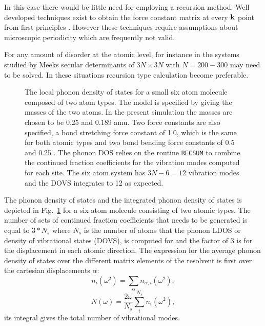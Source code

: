 In this case there would be little need for employing a recursion method.
Well developed techniques exist to obtain the force constant 
matrix at every ${\bf k}$ point from first principles \cite{baroni01}.
However these techniques require assumptions about
microscopic periodicity which are frequently  
not valid. 

For any amount of disorder at the atomic level, for instance in the systems 
studied by Meeks secular determinants of $3N\times3N$ with
$N=200-300$ may need to be solved. In these situations recursion 
type calculation become preferable. \cite{dean92}
%
\begin{figure}
\begin{center}
{\graphicspath{{./invariance/rec_examples/phonon/}}}
\caption{The local phonon density of states for a small six atom molecule 
composed of two atom types. The model is specified by giving the 
masses of the two atoms. In the present simulation 
the masses are chosen to be 0.25 and $0.189$ amu. Two force constants are also
specified, a bond stretching force constant of 1.0, 
which is the same for both atomic types
and two bond bending force constants of 0.5 and 0.25 \label{fig:phonondos}. 
The phonon DOS relies on the routine
\texttt{RECSUM} to combine the continued fraction coefficients 
for the vibration modes computed for each site. 
The six atom system has $3N-6=12$ vibration modes and the 
DOVS integrates to 12 as expected.}
\end{center}
\end{figure}
%
The phonon density of states and the integrated phonon density of 
states is depicted in Fig.~\ref{fig:phonondos} 
for a six atom molecule consisting of two atomic types. The number of 
sets of continued fraction coefficients
that needs to be generated is equal to $3*N_{s}$ where $N_{s}$ 
is the number of atoms that the phonon LDOS
or density of vibrational states (DOVS), is computed 
for and the factor of 3 is for the displacement in each 
atomic direction. The expression for the average phonon density of states
over the different matrix elements of the resolvent 
is first over the cartesian displacements $\alpha$:
%
\begin{equation}
n_{i}(\omega^{2}) = \sum_{\alpha}n_{\alpha,i}(\omega^{2}),
\end{equation}
%
\begin{equation}
N(\omega) = \frac{2\omega}{N_{s}}\sum_{i}^{N_{s}}n_{i}(\omega^{2}),
\end{equation}
%
its integral gives the total number of vibrational modes.

